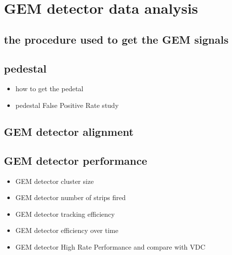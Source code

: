 \section{GEM detector data analysis}
\subsection{the procedure used to get the GEM signals}
\subsection{pedestal}
\begin{itemize}
    \item how to get the pedetal
    \item pedestal False Positive Rate study
\end{itemize}
\subsection{GEM detector alignment}
\subsection{GEM detector performance}
\begin{itemize}
    \item GEM detector cluster size
    \item GEM detector number of strips fired
    \item GEM detector tracking efficiency
    \item GEM detector efficiency over time 
    \item GEM detector High Rate Performance and compare with VDC 
\end{itemize}
